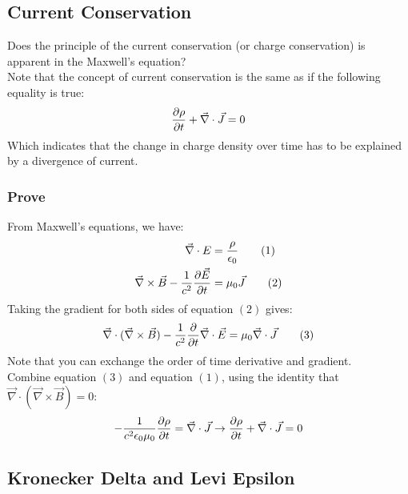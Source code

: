 \documentclass{article}
\begin{document}
\subsection*{Current Conservation}
Does the principle of the current conservation (or charge conservation) is apparent in the Maxwell's equation? \\ 
Note that the concept of current conservation is the same as if the following equality is true:
\begin{equation*}
  \pdv{\rho}{t} + \vec{\nabla} \cdot  \vec{J} = 0
\end{equation*}
Which indicates that the change in charge density over time has to be explained by a divergence of current. 
\subsubsection*{Prove}
From Maxwell's equations, we have:
\begin{align*}
  \vec{\nabla} \cdot  E &= \frac{\rho}{\epsilon_0} \tag{1}\\ 
  \vec{\nabla}  \times  \vec{B} - \frac{1}{c^2} \pdv{\vec{E}}{t} &= \mu_0 \vec{J} \tag{2}
\end{align*}
Taking the gradient for both sides of equation $(2)$ gives:
\begin{equation*}
  \vec{\nabla } \cdot (\vec{\nabla } \times  \vec{B} )- \frac{1}{c^2}\pdv{t}\vec{\nabla }\cdot \vec{E}  = \mu_0 \vec{\nabla} \cdot  \vec{J} \tag{3}
\end{equation*}
Note that you can exchange the order of time derivative and gradient.\\ 
Combine equation $(3)$ and equation $(1)$, using the identity that $\vec{\nabla} \cdot (\vec{\nabla } \times \vec{B}) = 0 $:
\begin{equation*}
  - \frac{1}{c^2 \epsilon_0 \mu_0} \pdv{\rho}{t} =  \vec{\nabla} \cdot \vec{J}    \to \pdv{\rho}{t} + \vec{\nabla}\cdot \vec{J}= 0  
\end{equation*}

\subsection*{Kronecker Delta and Levi Epsilon}
\end{document}
